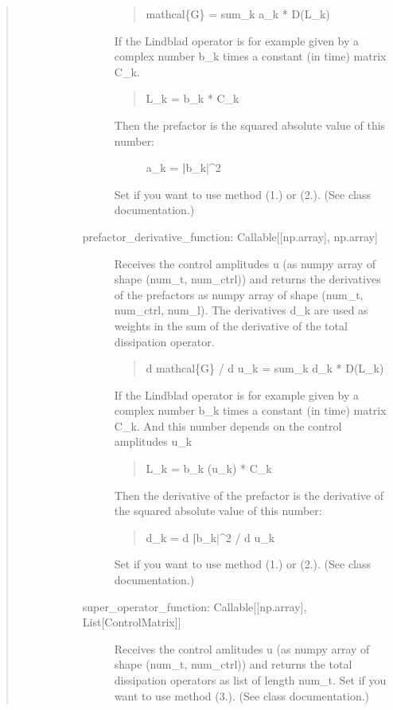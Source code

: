 \documentclass[letterpaper,10pt,english]{sphinxmanual}
\begin{document}
\begin{fulllineitems}
\begin{quote}
\begin{description}
\begin{description}
\begin{description}
\begin{quote}
mathcal\{G\} = sum\_k a\_k * D(L\_k)
\end{quote}

If the Lindblad operator is for example given by a complex number b\_k
times a constant (in time) matrix C\_k.
\begin{quote}

L\_k = b\_k * C\_k
\end{quote}
\begin{description}
\item[{Then the prefactor is the squared absolute value of this number:}] \leavevmode
a\_k = {\color{red}\bfseries{}|}b\_k|\textasciicircum{}2

\end{description}

Set if you want to use method (1.) or (2.). (See class documentation.)

\item[{prefactor\_derivative\_function: Callable{[}{[}np.array{]}, np.array{]}}] \leavevmode
Receives the control amplitudes u (as numpy array of shape
(num\_t, num\_ctrl)) and returns the derivatives of the
prefactors as numpy array of shape (num\_t, num\_ctrl, num\_l). The
derivatives d\_k are used as weights in the sum of the derivative of the
total dissipation operator.
\begin{quote}

d mathcal\{G\} / d u\_k = sum\_k d\_k * D(L\_k)
\end{quote}

If the Lindblad operator is for example given by a complex number b\_k
times a constant (in time) matrix C\_k. And this number depends on the
control amplitudes u\_k
\begin{quote}

L\_k = b\_k (u\_k) * C\_k
\end{quote}

Then the derivative of the prefactor is the derivative of the squared
absolute value of this number:
\begin{quote}

d\_k = d {\color{red}\bfseries{}|}b\_k|\textasciicircum{}2 / d u\_k
\end{quote}

Set if you want to use method (1.) or (2.). (See class documentation.)

\item[{super\_operator\_function: Callable{[}{[}np.array{]}, List{[}ControlMatrix{]}{]}}] \leavevmode
Receives the control amlitudes u (as numpy array of shape
(num\_t, num\_ctrl)) and returns the total dissipation
operators as list of length num\_t. Set if you want to use method (3.).
(See class documentation.)


\end{description}
\end{description}
\end{description}
\end{quote}
\end{fulllineitems}
\end{document}
